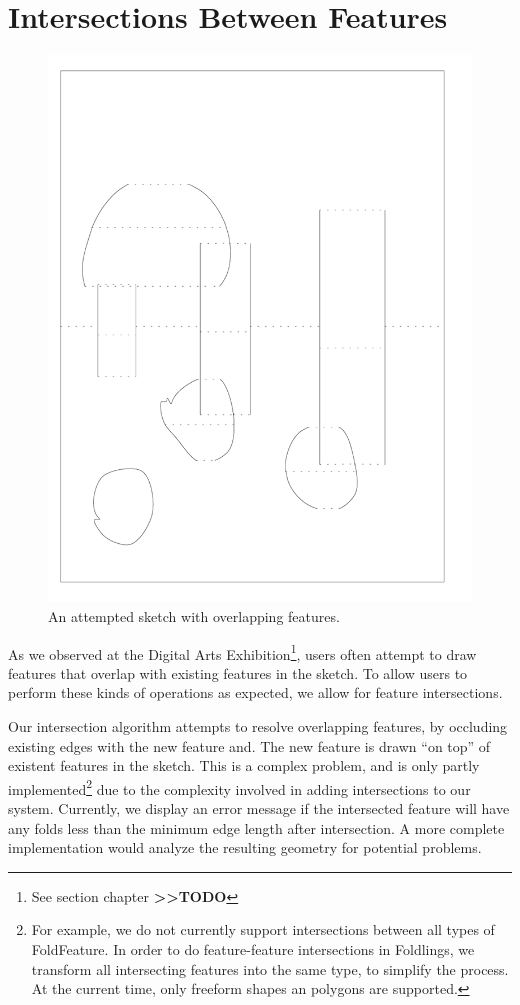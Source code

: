 \section{Intersections Between
Features}\label{intersections-between-features}

\begin{figure}[htbp]
\centering
\includegraphics{figures/91_Appendix_DAX_Creations/overlapping_features.png}
\caption{An attempted sketch with overlapping features.}
\end{figure}

As we observed at the Digital Arts Exhibition\footnote{See section
  chapter \textbf{\textgreater{}\textgreater{}TODO}}, users often
attempt to draw features that overlap with existing features in the
sketch. To allow users to perform these kinds of operations as expected,
we allow for feature intersections.

Our intersection algorithm attempts to resolve overlapping features, by
occluding existing edges with the new feature and. The new feature is
drawn ``on top'' of existent features in the sketch. This is a complex
problem, and is only partly implemented\footnote{For example, we do not
  currently support intersections between all types of FoldFeature. In
  order to do feature-feature intersections in Foldlings, we transform
  all intersecting features into the same type, to simplify the process.
  At the current time, only freeform shapes an polygons are supported.}
due to the complexity involved in adding intersections to our system.
Currently, we display an error message if the intersected feature will
have any folds less than the minimum edge length after intersection. A
more complete implementation would analyze the resulting geometry for
potential problems.

